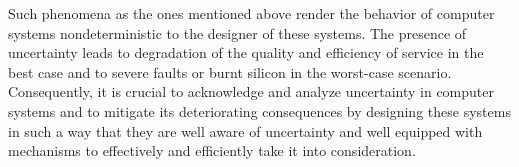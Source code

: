 Such phenomena as the ones mentioned above render the behavior of computer
systems nondeterministic to the designer of these systems. The presence of
uncertainty leads to degradation of the quality and efficiency of service in the
best case and to severe faults or burnt silicon in the worst-case scenario.
Consequently, it is crucial to acknowledge and analyze uncertainty in computer
systems and to mitigate its deteriorating consequences by designing these
systems in such a way that they are well aware of uncertainty and well equipped
with mechanisms to effectively and efficiently take it into consideration.
